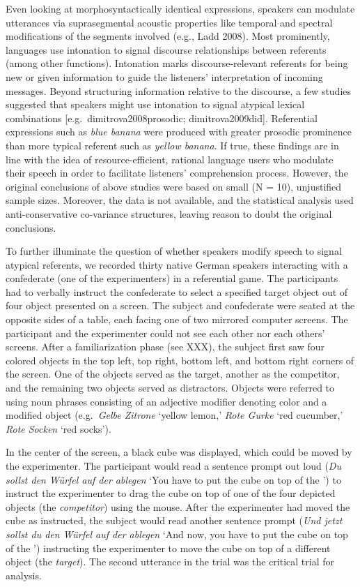 \documentclass[
  12pt,
]{article}
\begin{document}
Even looking at morphosyntactically identical expressions, speakers can modulate utterances via suprasegmental acoustic properties like temporal and spectral modifications of the segments involved (e.g., Ladd 2008).
Most prominently, languages use intonation to signal discourse relationships between referents (among other functions).
Intonation marks discourse-relevant referents for being new or given information to guide the listeners' interpretation of incoming messages.
Beyond structuring information relative to the discourse, a few studies suggested that speakers might use intonation to signal atypical lexical combinations {[}e.g.~dimitrova2008prosodic; dimitrova2009did{]}.
Referential expressions such as \emph{blue banana} were produced with greater prosodic prominence than more typical referent such as \emph{yellow banana}.
If true, these findings are in line with the idea of resource-efficient, rational language users who modulate their speech in order to facilitate listeners' comprehension process.
However, the original conclusions of above studies were based on small (N = 10), unjustified sample sizes.
Moreover, the data is not available, and the statistical analysis used anti-conservative co-variance structures, leaving reason to doubt the original conclusions.

To further illuminate the question of whether speakers modify speech to signal atypical referents, we recorded thirty native German speakers interacting with a confederate (one of the experimenters) in a referential game.
The participants had to verbally instruct the confederate to select a specified target object out of four object presented on a screen.
The subject and confederate were seated at the opposite sides of a table, each facing one of two mirrored computer screens.
The participant and the experimenter could not see each other nor each others' screens.
After a familiarization phase (see XXX), the subject first saw four colored objects in the top left, top right, bottom left, and bottom right corners of the screen.
One of the objects served as the target, another as the competitor, and the remaining two objects served as distractors.
Objects were referred to using noun phrases consisting of an adjective modifier denoting color and a modified object (e.g.~\emph{Gelbe Zitrone} `yellow lemon,' \emph{Rote Gurke} `red cucumber,' \emph{Rote Socken} `red socks').

In the center of the screen, a black cube was displayed, which could be moved by the experimenter.
The participant would read a sentence prompt out loud (\emph{Du sollst den Würfel auf der ablegen} `You have to put the cube on top of the ') to instruct the experimenter to drag the cube on top of one of the four depicted objects (the \emph{competitor}) using the mouse.
After the experimenter had moved the cube as instructed, the subject would read another sentence prompt (\emph{Und jetzt sollst du den Würfel auf der ablegen} `And now, you have to put the cube on top of the ') instructing the experimenter to move the cube on top of a different object (the \emph{target}).
The second utterance in the trial was the critical trial for analysis.
\end{document}
